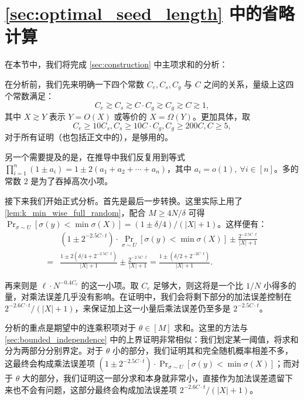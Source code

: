 \section{\ref{sec:optimal_seed_length} 中的省略计算}\label{sec:omitted_calculation}

在本节中，我们将完成 \ref{sec:construction} 中主项求和的分析：

\MinWiseMainTermSummation*

在分析前，我们先来明确一下四个常数 $C_e, C_s, C_g$ 与 $C$ 之间的关系，量级上这四个常数满足：
$$
C_e \gtrsim C_s \gtrsim C \cdot C_g \gtrsim C_g \gtrsim C \gtrsim 1,
$$
其中 $X \gtrsim Y$ 表示 $Y = O(X)$ 或等价的 $X = \Omega(Y)$。更加具体，取
$$
C_e \ge 10 C_s, C_s \ge 10 C \cdot C_g, C_g \ge 200 C, C \ge 5,
$$
对于所有证明（也包括正文中的），是够用的。

另一个需要提及的是，在推导中我们反复用到等式 $\prod_{i = 1}^n (1 \pm a_i) = 1 \pm 2 (a_1 + a_2 + \cdots + a_n)$，其中 $a_i = o(1),\ \forall i \in [n]$。多的常数 $2$ 是为了吞掉高次小项。

接下来我们开始正式分析。首先是最后一步转换。这里实际上用了 \cref{lem:k_min_wise_full_random}，配合 $M \ge 4 N / \delta$ 可得 $\Pr_{\sigma \sim U}[\sigma(y) < \min \sigma(X)] = (1 \pm \delta / 4) / (|X| + 1)$。这样便有：
\begin{align*}
      & (1 \pm 2^{-2.5 C \cdot t}) \cdot \Pr_{\sigma \sim U}[\sigma(y) < \min \sigma(X)] \pm \frac{2^{-2.5 C \cdot t}}{|X| + 1} \\
    = & \frac{1 \pm 2 (\delta / 4 + 2^{-2.5 C \cdot t})}{|X| + 1} \pm \frac{2^{-2.5 C \cdot t}}{|X| + 1} = \frac{1 \pm (\delta / 2 + 2^{-2 C \cdot t})}{|X| + 1}.
\end{align*}

再来则是 $\ell \cdot N^{-0.4 C_e}$ 的这一小项。取 $C_e$ 足够大，则这将是一个比 $1 / N$ 小得多的量，对乘法误差几乎没有影响。在证明中，我们会将剩下部分的加法误差控制在 $2^{-2.6 C \cdot t} / (|X| + 1)$，来保证加上这一小量后乘法误差仍至多是 $2^{-2.5 C \cdot t}$。

分析的重点是期望中的连乘积项对于 $\theta \in [M]$ 求和。这里的方法与 \ref{sec:bounded_independence} 中的上界证明非常相似：我们划定某一阈值，将求和分为两部分分别界定。对于 $\theta$ 小的部分，我们证明其和完全随机概率相差不多，这最终会构成乘法误差项 $(1 \pm 2^{-2.5 C \cdot t}) \cdot \Pr_{\sigma \sim U}[\sigma(y) < \min \sigma(X)]$；而对于 $\theta$ 大的部分，我们证明这一部分求和本身就非常小，直接作为加法误差遗留下来也不会有问题，这部分最终会构成加法误差项 $2^{-2.6 C \cdot t} / (|X| + 1)$。


